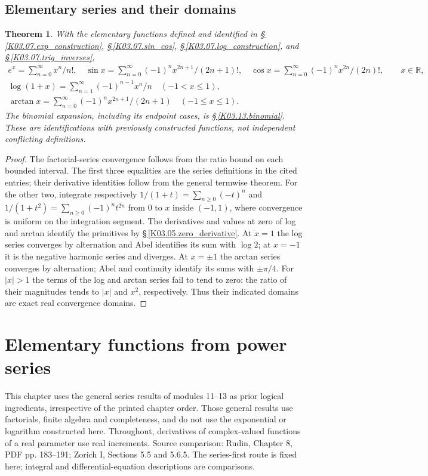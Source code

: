 \documentclass[11pt,oneside,a4paper]{book}
\newtheorem{theorem}{Theorem}[chapter]
\theoremstyle{definition}
\theoremstyle{remark}
\newcommand{\R}{\mathbb R}
\newcommand{\abs}[1]{\lvert#1\rvert}
\newcommand{\KEntry}[2]{\Needspace{7\baselineskip}\section{#2}\label{#1}{\small\sffamily\color{black!60}\detokenize{#1}}\par}
\newcommand{\KRef}[1]{\hyperref[#1]{\S\,\ref*{#1}}}
\newcommand{\SourceRef}[1]{{\small\textsf{Source comparison: #1.}}}
\begin{document}
\KEntry{K03.13.standard_series}{Elementary series and their domains}
\begin{theorem}
With the elementary functions defined and identified in \KRef{K03.07.exp_construction}, \KRef{K03.07.sin_cos}, \KRef{K03.07.log_construction}, and \KRef{K03.07.trig_inverses},
\[\begin{gathered}
e^x=\sum_{n=0}^\infty x^n/n!,\quad
\sin x=\sum_{n=0}^\infty(-1)^n x^{2n+1}/(2n+1)!,\quad
\cos x=\sum_{n=0}^\infty(-1)^n x^{2n}/(2n)!,\qquad x\in\R,\\
\log(1+x)=\sum_{n=1}^\infty(-1)^{n-1}x^n/n\quad(-1<x\leq1),\\
\arctan x=\sum_{n=0}^\infty(-1)^nx^{2n+1}/(2n+1)\quad(-1\leq x\leq1).
\end{gathered}\]
The binomial expansion, including its endpoint cases, is \KRef{K03.13.binomial}. These are identifications with previously constructed functions, not independent conflicting definitions.
\end{theorem}
\begin{proof}
The factorial-series convergence follows from the ratio bound on each bounded interval. The first three equalities are the series definitions in the cited entries; their derivative identities follow from the general termwise theorem. For the other two, integrate respectively $1/(1+t)=\sum_{n\geq0}(-t)^n$ and $1/(1+t^2)=\sum_{n\geq0}(-1)^nt^{2n}$ from $0$ to $x$ inside $(-1,1)$, where convergence is uniform on the integration segment. The derivatives and values at zero of log and arctan identify the primitives by \KRef{K03.05.zero_derivative}. At $x=1$ the log series converges by alternation and Abel identifies its sum with $\log2$; at $x=-1$ it is the negative harmonic series and diverges. At $x=\pm1$ the arctan series converges by alternation; Abel and continuity identify its sums with $\pm\pi/4$. For $\abs x>1$ the terms of the log and arctan series fail to tend to zero: the ratio of their magnitudes tends to $\abs x$ and $x^2$, respectively. Thus their indicated domains are exact real convergence domains.
\end{proof}

\chapter{Elementary functions from power series}
This chapter uses the general series results of modules 11--13 as prior logical
ingredients, irrespective of the printed chapter order. Those general results
use factorials, finite algebra and completeness, and do not use the exponential
or logarithm constructed here. Throughout, derivatives of complex-valued
functions of a real parameter use real increments.
\SourceRef{Rudin, Chapter 8, PDF pp. 183--191; Zorich I, Sections 5.5 and 5.6.5. The series-first route is fixed here; integral and differential-equation descriptions are comparisons}
\end{document}
